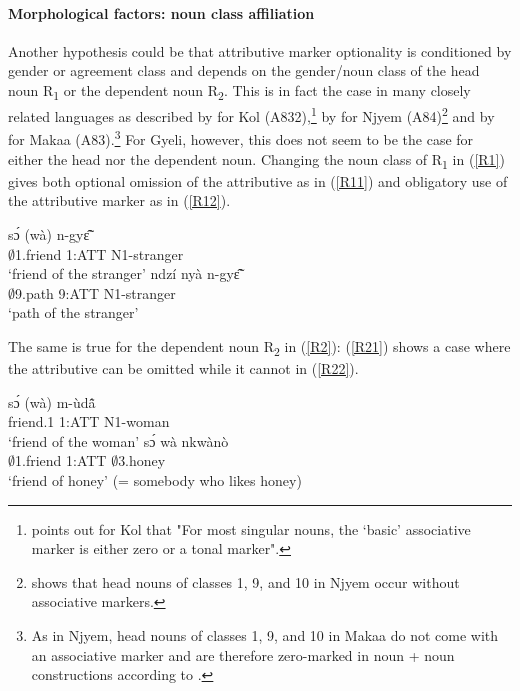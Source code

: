 \paragraph{Morphological factors: noun class affiliation} Another hypothesis could be that attributive marker optionality is conditioned by gender or agreement class and depends on the gender/noun class of the head noun R\textsubscript{1} or the dependent noun R\textsubscript{2}. This is in fact the case in many closely related languages as described by \citet{henson2007} for Kol (A832),\footnote{\citet[113]{henson2007}  points out for Kol that "For most singular nouns, the `basic' associative marker is either zero or a tonal marker".} by \citet{beavon2006} for Njyem (A84)\footnote{\citet[118]{beavon2006} shows that head nouns of classes 1, 9, and 10 in Njyem occur without associative markers.} and by \citet{heath2003} for Makaa (A83).\footnote{As in Njyem, head nouns of classes 1, 9, and 10 in Makaa do not come with an associative marker and are therefore zero-marked  in noun + noun constructions according to \citet[341]{heath2003}.} For Gyeli, however, this does not seem to be the case for either the head nor the dependent noun. Changing the noun class of R\textsubscript{1} in (\ref{R1}) gives both optional omission of the attributive as in (\ref{R11}) and obligatory use of the attributive marker as in (\ref{R12}).

\begin{exe}
\ex\label{R1}
\begin{xlist}
\ex \label{R11}
  \gll     sɔ́ (wà) n-gyɛ̃̂ \\
               $\emptyset$1.friend 1:ATT N1-stranger \\
    \trans `friend of the stranger'
\ex\label{R12}
 \gll     ndzí nyà n-gyɛ̃̂ \\
               $\emptyset$9.path 9:ATT N1-stranger \\
    \trans `path of the stranger'
\end {xlist}
\end{exe}


\noindent The same is true for the dependent noun R\textsubscript{2} in (\ref{R2}): (\ref{R21}) shows a case where the attributive can be omitted while it cannot in (\ref{R22}).

\begin{exe}
\ex\label{R2}
\begin{xlist}
\ex \label{R21}
  \gll     sɔ́ (wà) m-ùdã̂ \\
               friend.1 1:ATT  N1-woman \\
    \trans `friend of the woman'
\ex\label{R22}
 \gll     sɔ́ wà nkwànò \\
               $\emptyset$1.friend 1:ATT $\emptyset$3.honey \\
    \trans `friend of honey' (= somebody who likes honey)
\end {xlist}
\end{exe}

